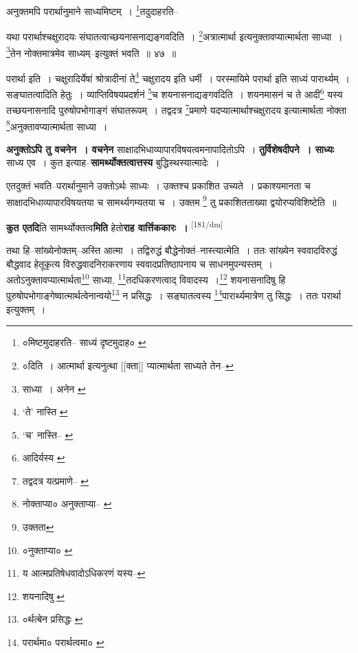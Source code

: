 \documentclass[article,12pt,a4paper]{memoir}
\begin{document}
	  \pstart अनुक्तमपि परार्थानुमाने साध्यमिष्टम् । \footnote{०मिष्टमुदाहरति--\cite{dp-msB} साध्यं दृष्टमुदाह० \cite{dp-msC} \cite{dp-msD}}तदुदाहरति--
	\pend
       

	  \pstart यथा परार्थाश्चक्षुरादयः संघातत्वाच्छयनासनाद्यङ्गवदिति । \footnote{०दिति । आत्मार्था इत्यनुत्था [[क्ता]] प्यात्मार्थता साध्यते तेन--\cite{dp-msC}}अत्रात्मार्था इत्यनुक्तावप्यात्मार्थता साध्या । \footnote{साध्या । अनेन \cite{dp-msB} \cite{dp-edP} \cite{dp-edH} \cite{dp-edE}}तेन नोक्तमात्रमेव साध्यम्--इत्युक्तं भवति ॥ ४७ ॥
	\pend
       

	  \pstart परार्था इति । चक्षुरादिर्येषां श्रोत्रादीनां ते\footnote{‘ते’ नास्ति \cite{dp-msB}} चक्षुरादय इति धर्मी । परस्मायिमे परार्था इति साध्यं पारार्थ्यम् । सङ्घातत्वादिति हेतुः । व्याप्तिविषयप्रदर्शनं \footnote{‘च’ नास्ति--\cite{dp-msA} \cite{dp-msB} \cite{dp-msD} \cite{dp-edP} \cite{dp-edH} \cite{dp-edE} \cite{dp-edN}}च शयनासनाद्यङ्गवदिति । शयनमासनं च ते आदी\footnote{आदिर्यस्य \cite{dp-msD}} यस्य तच्छयनासनादि पुरुषोपभोगाङ्गं संघातरूपम् । तद्वदत्र \footnote{तद्वदत्र यत्प्रमाणे--\cite{dp-msA} \cite{dp-msB} \cite{dp-edP} \cite{dp-edH}}प्रमाणे यदप्यात्मार्थाश्चक्षुरादय इत्यात्मार्थता नोक्ता \footnote{नोक्ताप्या० \cite{dp-msB} अनुक्ताप्या--\cite{dp-msA} \cite{dp-msC} \cite{dp-msD} \cite{dp-edP} \cite{dp-edH} \cite{dp-edE} \cite{dp-edN}}अनुक्तावप्यात्मार्थता साध्या ।
	\pend
      

	  \pstart \textbf{अनुक्तोऽपि तु वचनेन । वचनेन} साक्षादभिधाव्यापारविषयत्वमनापादितोऽपि । \textbf{तुर्विशेषदीपने । साध्यः} साध्य एव । कुत इत्याह--\textbf{सामर्थ्योक्तत्वात्तस्य} बुद्धिस्थस्यात्मादेः ।
	\pend
      

	  \pstart एतदुक्तं भवति--परार्थानुमाने उक्तोऽर्थः साध्यः । उक्तश्च प्रकाशित उच्यते । प्रकाश्यमानता च साक्षादभिधाव्यापारविषयतया च सामर्थ्यगम्यतया च । उक्तम \footnote{उक्तता} तु प्रकाशितताख्या द्वयोरप्यविशिष्टेति ॥
	\pend
      

	  \pstart \textbf{कुत एतदि}ति सामर्थ्योक्तत्व\textbf{मिति} हेतो\textbf{राह वार्त्तिककारः ।}
	\pend
      \leavevmode\textsuperscript{\rmlatinfont\tiny [181/dm]}

	  \pstart तथा हि--सांख्येनोक्तम्--अस्ति आत्मा । तद्विरुद्धं बौद्धेनोक्तं--नास्त्यात्मेति । ततः सांख्येन स्ववादविरुद्धं बौद्धवाद हेतूकृत्य विरुद्धवादनिराकरणाय स्ववादप्रतिष्ठापनाय च साधनमुपन्यस्तम् । अतोऽनुक्तावप्यात्मार्थता\footnote{०नुक्ताप्या० \cite{dp-msA} \cite{dp-msB} \cite{dp-msC} \cite{dp-msD} \cite{dp-edP} \cite{dp-edH} \cite{dp-edE} \cite{dp-edN}} साध्या, \footnote{य आत्मप्रतिषेधवादोऽधिकरणं यस्य--\cite{dp-msD-n}}तदधिकरणत्वाद् विवादस्य ।\footnote{शयनादिषु \cite{dp-msA}} शयनासनादिषु हि पुरुषोपभोगाङ्गेष्वात्मार्थत्वेनान्वयो\footnote{०र्थत्बेन प्रसिद्धः \cite{dp-msA}} न प्रसिद्धः । सङ्घातत्वस्य \footnote{परार्थमा० \cite{dp-msA} \cite{dp-msB} \cite{dp-edP} \cite{dp-edH} परार्थत्वमा० \cite{dp-edN}}पारार्थ्यमात्रेण तु सिद्धः । ततः परार्था इत्युक्तम् ।
	\pend
       
\end{document}
